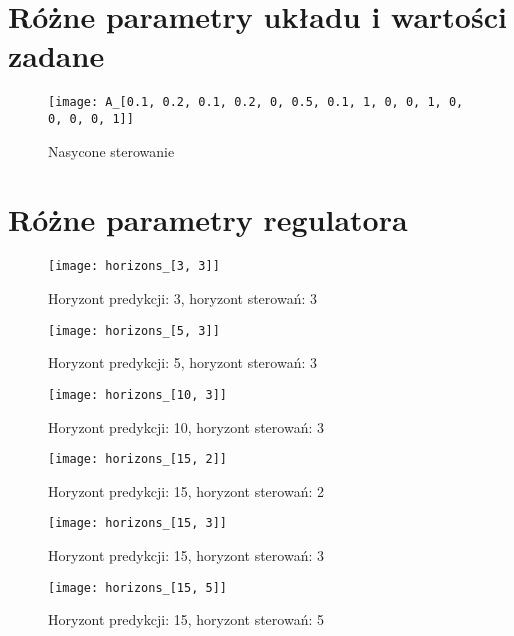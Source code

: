 \section{Różne parametry układu i wartości zadane}

\begin{figure}[p]
    \centering
	\texttt{[image: A\_[0.1, 0.2, 0.1, 0.2, 0, 0.5, 0.1, 1, 0, 0, 1, 0, 0, 0, 0, 1]]}
	\caption{Nasycone sterowanie}
	\label{fig:saturated}
\end{figure}

\section{Różne parametry regulatora}

\begin{figure}[p]
    \centering
	\texttt{[image: horizons\_[3, 3]]}
	\caption{Horyzont predykcji: 3, horyzont sterowań: 3}
	\label{fig:horizons_3_3}
\end{figure}

\begin{figure}[p]
    \centering
	\texttt{[image: horizons\_[5, 3]]}
	\caption{Horyzont predykcji: 5, horyzont sterowań: 3}
	\label{fig:horizons_5_3}
\end{figure}

\begin{figure}[p]
    \centering
	\texttt{[image: horizons\_[10, 3]]}
	\caption{Horyzont predykcji: 10, horyzont sterowań: 3}
	\label{fig:horizons_10_3}
\end{figure}

\begin{figure}[p]
    \centering
	\texttt{[image: horizons\_[15, 2]]}
	\caption{Horyzont predykcji: 15, horyzont sterowań: 2}
	\label{fig:horizons_15_2}
\end{figure}

\begin{figure}[p]
    \centering
	\texttt{[image: horizons\_[15, 3]]}
	\caption{Horyzont predykcji: 15, horyzont sterowań: 3}
	\label{fig:horizons_15_3}
\end{figure}

\begin{figure}[p]
    \centering
	\texttt{[image: horizons\_[15, 5]]}
	\caption{Horyzont predykcji: 15, horyzont sterowań: 5}
	\label{fig:horizons_15_5}
\end{figure}

